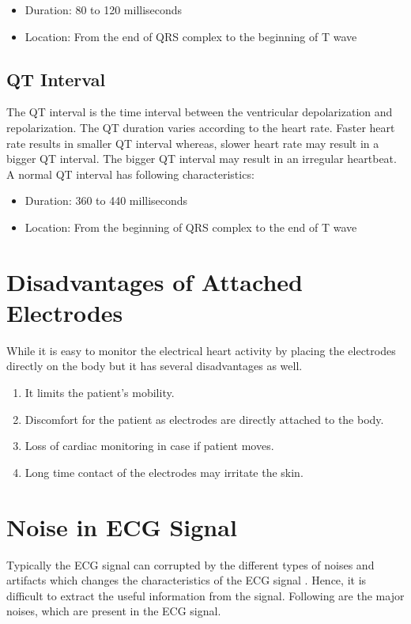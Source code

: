 \begin{itemize}
	\item Duration: 80 to 120 milliseconds
	\item Location: From the end of QRS complex to the beginning of T wave
\end{itemize}

\subsection{QT Interval}
The QT interval is the time interval between the ventricular depolarization and repolarization. The QT duration varies according to the heart rate. Faster heart rate results in smaller QT interval whereas, slower heart rate may result in a bigger QT interval. The bigger QT interval may result in an irregular heartbeat. A normal QT interval has following characteristics:

\begin{itemize}
	\item Duration: 360 to 440 milliseconds
	\item Location: From the beginning of QRS complex to the end of T wave
\end{itemize}

\section{Disadvantages of Attached Electrodes} \label{electrodes_disadv}

While it is easy to monitor the electrical heart activity by placing the electrodes directly on the body but it has several disadvantages as well.

\begin{enumerate}
	\item It limits the patient's mobility.
	\item Discomfort for the patient as electrodes are directly attached to the body.
	\item Loss of cardiac monitoring in case if patient moves.
	\item Long time contact of the electrodes may irritate the skin.
\end{enumerate}

\section{Noise in ECG Signal}
Typically the ECG signal can  corrupted by the different types of noises and artifacts which changes the characteristics of the ECG signal \cite{limaye2016ecg}. Hence, it is difficult to extract the useful information from the signal. Following are the major noises, which are present in the ECG signal.

